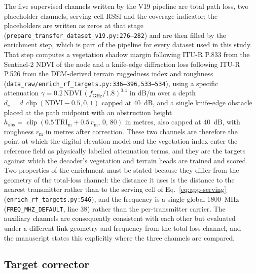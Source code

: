 The five supervised channels written by the V19 pipeline are total path
loss, two placeholder channels, serving-cell RSSI and the coverage
indicator; the placeholders are written as zeros at that stage
(\texttt{prepare\_\allowbreak{}transfer\_\allowbreak{}dataset\_\allowbreak{}v19.py:\allowbreak{}276--282}) and are then filled
by the enrichment step, which is part of the pipeline for every dataset
used in this study. That step computes a vegetation shadow margin
following ITU-R P.833 from the Sentinel-2 NDVI of the node and a
knife-edge diffraction loss following ITU-R P.526 from the DEM-derived
terrain ruggedness index and roughness
(\texttt{data\_\allowbreak{}raw/\allowbreak{}enrich\_\allowbreak{}rf\_\allowbreak{}targets\allowbreak{}.py:\allowbreak{}336--396,533--534}), using a
specific attenuation $\gamma = 0.2\,\mathrm{NDVI}\,(f_{\mathrm{GHz}}/1.8)^{0.4}$
in dB/m over a depth $d_{v} = d\,\operatorname{clip}(\mathrm{NDVI}-0.5,0,1)$
capped at 40~dB, and a single knife-edge obstacle placed at the path
midpoint with an obstruction height
$h_{\mathrm{obs}} = \operatorname{clip}(0.5\,\mathrm{TRI}_{\mathrm{m}} + 0.5\,r_{\mathrm{m}},\,0,\,80)$
in metres, also capped at 40~dB, with roughness $r_{\mathrm{m}}$ in metres after
correction. These two channels are therefore the point
at which the digital elevation model and the vegetation index enter the
reference field as physically labelled attenuation terms, and they are the
targets against which the decoder's vegetation and terrain heads are
trained and scored. Two properties of the enrichment must be stated because
they differ from the geometry of the total-loss channel: the distance it
uses is the distance to the nearest transmitter rather than to the serving
cell of Eq.~\eqref{eq:app-serving}
(\texttt{enrich\_\allowbreak{}rf\_\allowbreak{}targets\allowbreak{}.py:\allowbreak{}546}), and the frequency is a single
global 1800~MHz (\texttt{FREQ\_\allowbreak{}MHZ\_\allowbreak{}DEFAULT}, line 38) rather than the
per-transmitter carrier. The auxiliary channels are consequently
consistent with each other but evaluated under a different link geometry
and frequency from the total-loss channel, and the manuscript states this
explicitly where the three channels are compared.

\subsection{Target corrector}
\label{app:corrector}

